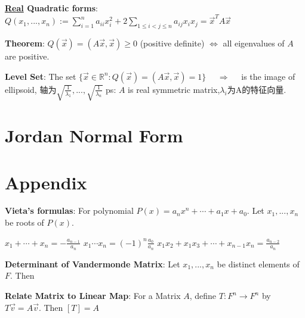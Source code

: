 \documentclass[9pt]{article}
\begin{document}
\textbf{\underline{Real} Quadratic forms}: $Q(x_1,...,x_n):=\sum_{i=1}^n a_{ii}x_i^2+2\sum_{1\le i<j\le n}a_{ij}x_ix_j=\vec{x}^TA\vec{x}$ 

\vspace{-1pt}

\quad \textbf{Theorem}: $Q(\vec{x})=(A\vec{x},\vec{x})\geq0$ (positive definite) $\Leftrightarrow$ all eigenvalues of $A$ are positive. 

\textbf{Level Set}: {\footnotesize The set $\{\vec{x}\in\mathbb{R}^n:Q(\vec{x})=(A\vec{x},\vec{x})=1\}$ \ \ $\Rightarrow$ \ \ is the image of ellipsoid, 轴为$\sqrt{\frac{1}{\lambda_1}},...,\sqrt{\frac{1}{\lambda_n}}$} {\scriptsize ps: $A$ is real symmetric matrix,$\lambda_i$为A的特征向量.}

\vspace{-1pt}


\section{Jordan Normal Form} %


\section{Appendix} %

\textbf{Vieta's formulas}: For polynomial $P(x)=a_nx^n+\cdots+a_1x+a_0$. \quad Let $x_1,...,x_n$ be roots of $P(x)$.

\qquad  $x_1+\cdots+x_n=-\frac{a_{n-1}}{a_n}$ \quad $x_1\cdots x_n=(-1)^n\frac{a_0}{a_n}$ \quad $x_1x_2+x_1x_3+\cdots+x_{n-1}x_n=\frac{a_{n-2}}{a_n}$

\vspace{-13pt}
\textbf{Determinant of Vandermonde Matrix}: Let $x_1,...,x_n$ be distinct elements of $F$. \quad Then 
\vspace{-13pt}

\textbf{Relate Matrix to Linear Map}: For a Matrix $A$, define $T:F^n\to F^n$ by $T\vec{v}=A\vec{v}$. Then $[T]=A$
\end{document}
